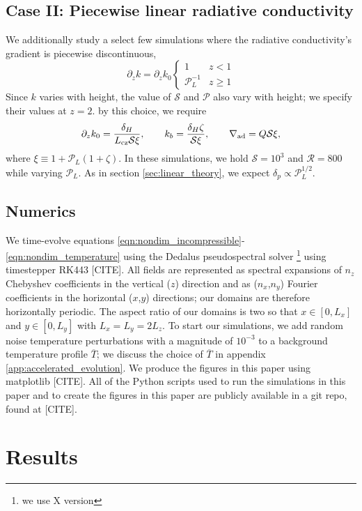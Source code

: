 \documentclass{aastex631}
\newcommand{\gradad}{\ensuremath{\nabla_{\rm{ad}}}}
\newcommand{\mP}{\ensuremath{\mathcal{P}}}
\newcommand{\Lcz}{\ensuremath{L_{\rm{cz}}}}
\newcommand{\mR}{\ensuremath{\mathcal{R}}}
\newcommand{\mS}{\ensuremath{\mathcal{S}}}
\begin{document}
\subsection{Case II: Piecewise linear radiative conductivity}
We additionally study a select few simulations where the radiative conductivity's gradient is piecewise discontinuous,
\begin{equation}
\partial_z k = \partial_z k_0
\begin{cases}
1	&	z < 1 \\
\mP_L^{-1} &	z \geq 1
\end{cases}
\end{equation}
Since $k$ varies with height, the value of $\mS$ and $\mP$ also vary with height; we specify their values at $z = 2$.
by this choice, we require
\begin{equation}
\partial_z k_0 = \frac{\delta_H}{\Lcz \mS \xi},\qquad
k_b = \frac{\delta_H\zeta}{\mS\xi},\qquad
\gradad = Q \mS \xi,
\end{equation}
where $\xi \equiv 1 + \mP_L(1 + \zeta)$.
In these simulations, we hold $\mS = 10^3$ and $\mR = 800$ while varying $\mP_L$.
As in section \ref{sec:linear_theory}, we expect $\delta_p \propto \mP_L^{1/2}$.

\subsection{Numerics}
We time-evolve equations \ref{eqn:nondim_incompressible}-\ref{eqn:nondim_temperature} using the Dedalus pseudospectral solver \citep{burns_etal_2020}\footnote{we use X version} using timestepper RK443 [CITE].
All fields are represented as spectral expansions of $n_z$ Chebyshev coefficients in the vertical ($z$) direction and as ($n_x$,$n_y$) Fourier coefficients in the horizontal ($x$,$y$) directions; our domains are therefore horizontally periodic.
The aspect ratio of our domains is two so that $x \in [0, L_x]$ and $y \in [0, L_y]$ with $L_x = L_y = 2 L_z$.
To start our simulations, we add random noise temperature perturbations with a magnitude of $10^{-3}$ to a background temperature profile $\overline{T}$; we discuss the choice of $\overline{T}$ in appendix \ref{app:accelerated_evolution}.
We produce the figures in this paper using matplotlib [CITE].
All of the Python scripts used to run the simulations in this paper and to create the figures in this paper are publicly available in a git repo, found at [CITE].



\section{Results}
\label{sec:results}
\end{document}
